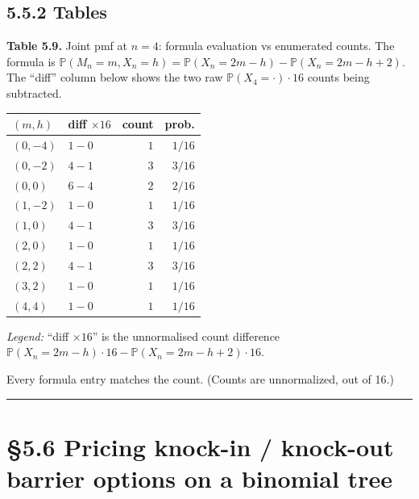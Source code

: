 \documentclass[
  10pt,
  twoside]{book}
\newcounter{none} %
\begin{document}
\subsection{5.5.2 Tables}\label{tables-15}

\textbf{Table 5.9.} Joint pmf at \(n = 4\): formula evaluation vs
enumerated counts. The formula is
\(\mathbb P(M_n = m, X_n = h) = \mathbb P(X_n = 2m - h) - \mathbb P(X_n = 2m - h + 2)\).
The ``diff'' column below shows the two raw
\(\mathbb P(X_4=\cdot)\cdot 16\) counts being subtracted.

{\def\LTcaptype{none} %
\begin{table}[H]
\centering
\begin{tabular}{|l|l|r|r|}
\toprule
\((m, h)\) & diff \(\times 16\) & count & prob. \\
\midrule



\((0, -4)\) & \(1 - 0\) & \(1\) & \(1/16\) \\
\((0, -2)\) & \(4 - 1\) & \(3\) & \(3/16\) \\
\((0, 0)\) & \(6 - 4\) & \(2\) & \(2/16\) \\
\((1, -2)\) & \(1 - 0\) & \(1\) & \(1/16\) \\
\((1, 0)\) & \(4 - 1\) & \(3\) & \(3/16\) \\
\((2, 0)\) & \(1 - 0\) & \(1\) & \(1/16\) \\
\((2, 2)\) & \(4 - 1\) & \(3\) & \(3/16\) \\
\((3, 2)\) & \(1 - 0\) & \(1\) & \(1/16\) \\
\((4, 4)\) & \(1 - 0\) & \(1\) & \(1/16\) \\
\bottomrule
\end{tabular}
\end{table}
}

\emph{Legend:} ``diff \(\times 16\)'' is the unnormalised count
difference
\(\mathbb P(X_n = 2m - h)\cdot 16 - \mathbb P(X_n = 2m - h + 2)\cdot 16\).

Every formula entry matches the count. (Counts are unnormalized, out of
16.)

\begin{center}\rule{0.5\linewidth}{0.5pt}\end{center}

\section{§5.6 Pricing knock-in / knock-out barrier options on a binomial
tree}\label{pricing-knock-in-knock-out-barrier-options-on-a-binomial-tree}
\end{document}
